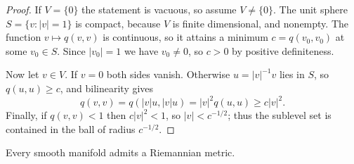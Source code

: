 \begin{proof}
\leanok
If $V = \{0\}$ the statement is vacuous, so assume $V \neq \{0\}$. The unit sphere $S = \{v : |v| = 1\}$ is compact, because $V$ is finite dimensional, and nonempty. The function $v \mapsto q(v,v)$ is continuous, so it attains a minimum $c = q(v_0, v_0)$ at some $v_0 \in S$. Since $|v_0| = 1$ we have $v_0 \neq 0$, so $c > 0$ by positive definiteness.

Now let $v \in V$. If $v = 0$ both sides vanish. Otherwise $u = |v|^{-1} v$ lies in $S$, so $q(u,u) \geq c$, and bilinearity gives
\[
q(v,v) = q(|v| u, |v| u) = |v|^2 q(u,u) \geq c |v|^2 .
\]
Finally, if $q(v,v) < 1$ then $c |v|^2 < 1$, so $|v| < c^{-1/2}$; thus the sublevel set is contained in the ball of radius $c^{-1/2}$.
\end{proof}

\begin{proposition}
\label{prop:existence-riemannian-metric}
\leanok
{}
Every smooth manifold admits a Riemannian metric.
\end{proposition}

